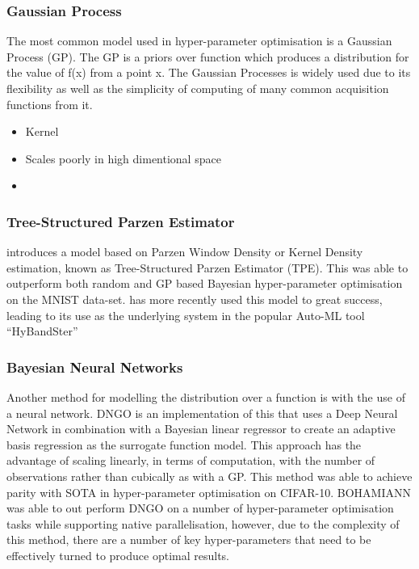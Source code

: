 		\subsubsection{Gaussian Process}

			The most common model used in hyper-parameter optimisation is a Gaussian Process (GP)\cite{17}. The GP is a priors over function which produces a distribution for the value of f(x) from a point x. The Gaussian Processes is widely used due to its flexibility as well as the simplicity of computing of many common acquisition functions from it.


		\begin{itemize}

		\item Kernel

		\item Scales poorly in high dimentional space

		\item 

		\end{itemize}



		\subsubsection{Tree-Structured Parzen Estimator}

			\cite{20} introduces a model based on Parzen Window Density or Kernel Density estimation, known as Tree-Structured Parzen Estimator (TPE). This was able to outperform both random and GP based Bayesian hyper-parameter optimisation on the MNIST data-set. \cite{32} has more recently used this model to great success, leading to its use as the underlying system in the popular Auto-ML tool “HyBandSter” \cite{34}



		\subsubsection{Bayesian Neural Networks}

			Another method for modelling the distribution over a function is with the use of a neural network. DNGO \cite{22} is an implementation of this that uses a Deep Neural Network in combination with a Bayesian linear regressor to create an adaptive basis regression as the surrogate function model. This approach has the advantage of scaling linearly, in terms of computation, with the number of observations rather than cubically as with a GP. This method was able to achieve parity with SOTA in hyper-parameter optimisation on CIFAR-10. BOHAMIANN \cite{40} was able to out perform DNGO on a number of hyper-parameter optimisation tasks while supporting native parallelisation, however, due to the complexity of this method, there are a number of key hyper-parameters that need to be effectively turned to produce optimal results.




